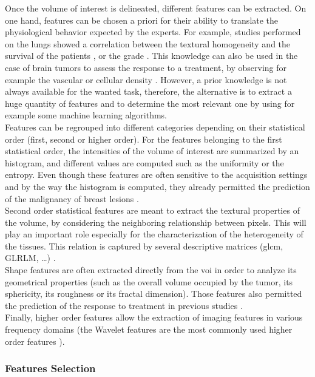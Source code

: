 Once the volume of interest is delineated, different features can be
extracted. On one hand, features can be chosen a priori for their
ability to translate the physiological behavior expected by the
experts. For example, studies performed on the lungs showed a
correlation between the textural homogeneity and the survival of the
patients \cite{Ganeshan2012,Balagurunathan2014}, or the grade
\cite{Al-Kadi2008}. This knowledge can also be used in the case of
brain tumors to assess the response to a treatment, by observing for
example the vascular or cellular density \cite{Cao2006,Zhou2014}. 
However, a prior knowledge is not always available for the wanted
task, therefore, the alternative is to extract a huge quantity of
features and to determine the most relevant one by using for example
some machine learning algorithms.\\
Features can be regrouped into different categories depending on their
statistical order (first, second or higher order). For the features
belonging to the first statistical order, the intensities of the volume of interest are 
summarized by an histogram, and different values are computed such as
the uniformity or the entropy. Even though these features are often
sensitive to the acquisition settings and by the way the histogram is computed, they already permitted the prediction of
the malignancy of breast lesions \cite{Parekh2016}.\\
Second order statistical features are meant to extract the textural
properties of the volume, by considering the neighboring relationship
between pixels. This will play an important role especially for the
characterization of the heterogeneity of the tissues. This relation is
captured by several descriptive matrices (\ac{glcm}, GLRLM,
\ldots{}) \cite{Parekh2016}.\\
Shape features are often extracted directly from the \ac{voi} in order to
analyze its geometrical properties (such as the overall volume occupied
by the tumor, its sphericity, its roughness or its fractal dimension).
Those features also permitted the prediction of the response to
treatment in previous studies \cite{Thawani2018}.\\
Finally, higher order features allow the extraction of imaging features
in various frequency domains (the Wavelet features are the most commonly
used higher order features \cite{Thawani2018}).

\subsubsection{Features Selection}\label{features-selection}

